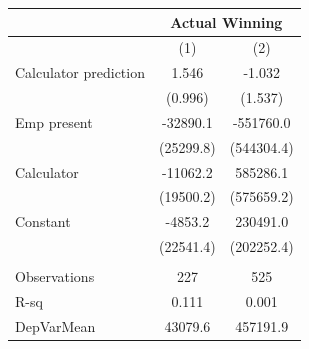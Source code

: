 \begin{tabular}{lcc}
\toprule
      & \multicolumn{2}{c}{Actual Winning} \\
\midrule
\midrule
      & (1)   & (2) \\
\midrule
\midrule
Calculator prediction & 1.546 & -1.032 \\
      & (0.996) & (1.537) \\
Emp present & -32890.1 & -551760.0 \\
      & (25299.8) & (544304.4) \\
Calculator & -11062.2 & 585286.1 \\
      & (19500.2) & (575659.2) \\
Constant  & -4853.2 & 230491.0 \\
      & (22541.4) & (202252.4) \\
      &       &  \\
\midrule
Observations & 227   & 525 \\
R-sq  & 0.111 & 0.001 \\
DepVarMean & 43079.6 & 457191.9 \\
\bottomrule
\bottomrule
\end{tabular}%
